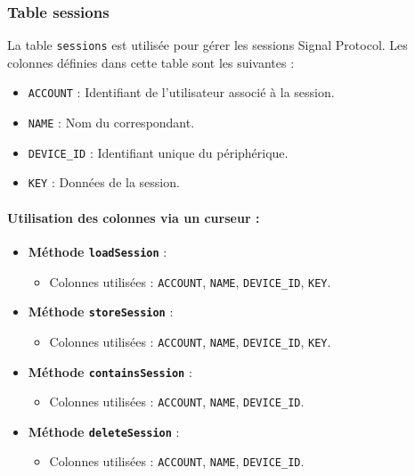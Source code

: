 \documentclass[a4paper,11pt]{article}
\begin{document}
\subsubsection*{Table sessions}

La table \texttt{sessions} est utilisée pour gérer les sessions Signal Protocol. Les colonnes définies dans cette table sont les suivantes :

\begin{itemize}
    \item \texttt{ACCOUNT} : Identifiant de l'utilisateur associé à la session.
    \item \texttt{NAME} : Nom du correspondant.
    \item \texttt{DEVICE\_ID} : Identifiant unique du périphérique.
    \item \texttt{KEY} : Données de la session.
\end{itemize}

\paragraph{Utilisation des colonnes via un curseur :}
\begin{itemize}
    \item \textbf{Méthode \texttt{loadSession}} :
    \begin{itemize}
        \item Colonnes utilisées : \texttt{ACCOUNT}, \texttt{NAME}, \texttt{DEVICE\_ID}, \texttt{KEY}.
    \end{itemize}
    \item \textbf{Méthode \texttt{storeSession}} :
    \begin{itemize}
        \item Colonnes utilisées : \texttt{ACCOUNT}, \texttt{NAME}, \texttt{DEVICE\_ID}, \texttt{KEY}.
    \end{itemize}
    \item \textbf{Méthode \texttt{containsSession}} :
    \begin{itemize}
        \item Colonnes utilisées : \texttt{ACCOUNT}, \texttt{NAME}, \texttt{DEVICE\_ID}.
    \end{itemize}
    \item \textbf{Méthode \texttt{deleteSession}} :
    \begin{itemize}
        \item Colonnes utilisées : \texttt{ACCOUNT}, \texttt{NAME}, \texttt{DEVICE\_ID}.
    \end{itemize}
\end{itemize}
\end{document}
